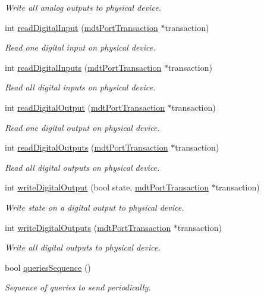 \begin{DoxyCompactItemize}
\begin{DoxyCompactList}\small\item\em Write all analog outputs to physical device. \end{DoxyCompactList}\item 
int \hyperlink{classmdt_device_modbus_a9dd05e51223ee5bb79970fbe84c501f9}{readDigitalInput} (\hyperlink{classmdt_port_transaction}{mdtPortTransaction} $\ast$transaction)
\begin{DoxyCompactList}\small\item\em Read one digital input on physical device. \end{DoxyCompactList}\item 
int \hyperlink{classmdt_device_modbus_a3fba9e113092f9da187cf684fb62b132}{readDigitalInputs} (\hyperlink{classmdt_port_transaction}{mdtPortTransaction} $\ast$transaction)
\begin{DoxyCompactList}\small\item\em Read all digital inputs on physical device. \end{DoxyCompactList}\item 
int \hyperlink{classmdt_device_modbus_a13a334ac86135751893f37064d8f548d}{readDigitalOutput} (\hyperlink{classmdt_port_transaction}{mdtPortTransaction} $\ast$transaction)
\begin{DoxyCompactList}\small\item\em Read one digital output on physical device. \end{DoxyCompactList}\item 
int \hyperlink{classmdt_device_modbus_a8915a036472bff0f356756992c1eae51}{readDigitalOutputs} (\hyperlink{classmdt_port_transaction}{mdtPortTransaction} $\ast$transaction)
\begin{DoxyCompactList}\small\item\em Read all digital outputs on physical device. \end{DoxyCompactList}\item 
int \hyperlink{classmdt_device_modbus_a6950c10fc521b193fb3c754223879694}{writeDigitalOutput} (bool state, \hyperlink{classmdt_port_transaction}{mdtPortTransaction} $\ast$transaction)
\begin{DoxyCompactList}\small\item\em Write state on a digital output to physical device. \end{DoxyCompactList}\item 
int \hyperlink{classmdt_device_modbus_aad3ce85a19307e3056b940da99fe512b}{writeDigitalOutputs} (\hyperlink{classmdt_port_transaction}{mdtPortTransaction} $\ast$transaction)
\begin{DoxyCompactList}\small\item\em Write all digital outputs to physical device. \end{DoxyCompactList}\item 
bool \hyperlink{classmdt_device_modbus_a3b83b926ed1f9c3bdf7024de2745c285}{queriesSequence} ()
\begin{DoxyCompactList}\small\item\em Sequence of queries to send periodically. \end{DoxyCompactList}\end{DoxyCompactItemize}
